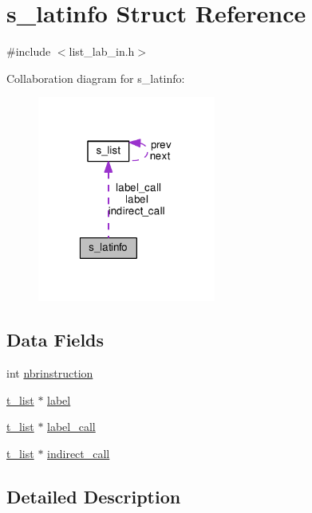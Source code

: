 \hypertarget{structs__latinfo}{\section{s\-\_\-latinfo Struct Reference}
\label{structs__latinfo}
}


{\ttfamily \#include $<$list\-\_\-lab\-\_\-in.\-h$>$}



Collaboration diagram for s\-\_\-latinfo\-:\nopagebreak
\begin{figure}[H]
\begin{center}
\leavevmode
\includegraphics[width=166pt]{d9/d12/structs__latinfo__coll__graph}
\end{center}
\end{figure}
\subsection*{Data Fields}
\begin{DoxyCompactItemize}
\item 
int \hyperlink{structs__latinfo_a565ba05926f2219e68cf55a13f15fbab}{nbrinstruction}
\item 
\hyperlink{gen__list_8h_aefde00352c5326bb1c28ebd4404c4795}{t\-\_\-list} $\ast$ \hyperlink{structs__latinfo_a53b5fc61b57ec971b013fa338a3adfc7}{label}
\item 
\hyperlink{gen__list_8h_aefde00352c5326bb1c28ebd4404c4795}{t\-\_\-list} $\ast$ \hyperlink{structs__latinfo_ab7161df38e24c00cc4f576cec776ea81}{label\-\_\-call}
\item 
\hyperlink{gen__list_8h_aefde00352c5326bb1c28ebd4404c4795}{t\-\_\-list} $\ast$ \hyperlink{structs__latinfo_a2644eca4f289d61e8f2e5923cf5a3a6c}{indirect\-\_\-call}
\end{DoxyCompactItemize}


\subsection{Detailed Description}


